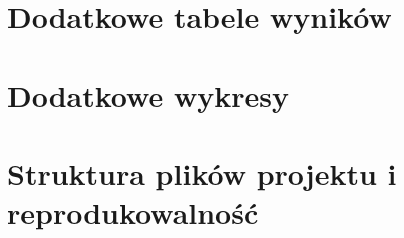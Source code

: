 \chapter{Dodatkowe tabele wyników}


\chapter{Dodatkowe wykresy}


\chapter{Struktura plików projektu i reprodukowalność}

